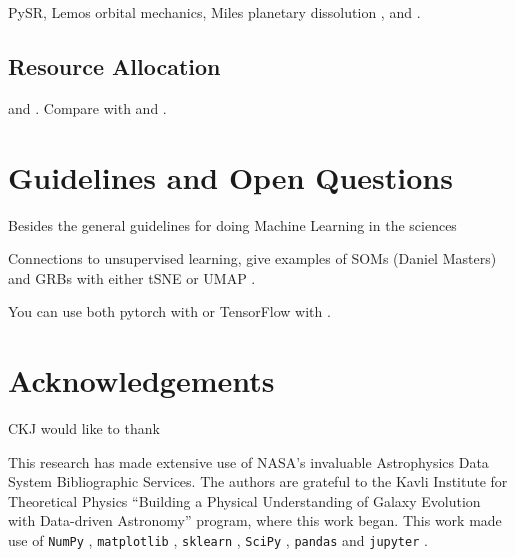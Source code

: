 \documentclass[twocolumn,floatfix]{aastex63}
\begin{document}
PySR, Lemos orbital mechanics, Miles planetary dissolution \cite{Cranmer2020_PySR_1, Cranmer2023_PySR}, \cite{Lemos2022_orbital_mechanics_GNN_PySR} and \cite{Cranmer2021_GNN_planetary_dissolution}.

\subsection{Resource Allocation}
\label{subsec:resource_allocation}

\cite{Cranmer2021_resource_allocation} and \cite{WangMelchior2022_resource_allocation}. Compare with \cite{Malz2021_observing_strategies} and \cite{Vujeva2023_survey_design}.

\section{Guidelines and Open Questions}
\label{sec:discussion}

Besides the general guidelines for doing Machine Learning in the sciences \citep{ReviewMachineLearning, ShlomiBattagle2020_GNN_physics_review}




Connections to unsupervised learning, give examples of SOMs (Daniel Masters) and GRBs \cite{Jespersen2020_tSNE_GRB} with either tSNE or UMAP \citep{VanderMaaten08_tSNE, Mcinnes18_UMAP}. 

You can use both pytorch \cite{Paszke2019_PyTorch} with \cite{Fey19_PyTorchGeometric} or TensorFlow \cite{tensorflow} with \cite{Grattarola2020_spektral}.

\section{Acknowledgements}

CKJ would like to thank 

This research has made extensive use of NASA’s invaluable Astrophysics Data System Bibliographic Services. The authors are grateful to the Kavli Institute for Theoretical Physics “Building a Physical Understanding of Galaxy Evolution with Data-driven Astronomy” program, where this work began. This work made use of \texttt{NumPy} \citep{numpy}, \texttt{matplotlib} \citep{matplotlib}, \texttt{sklearn} \citep{sklearn}, \texttt{SciPy} \citep{scipy}, \texttt{pandas} \citep{pandas} and \texttt{jupyter} \citep{jupyter}.






\appendix
\end{document}
